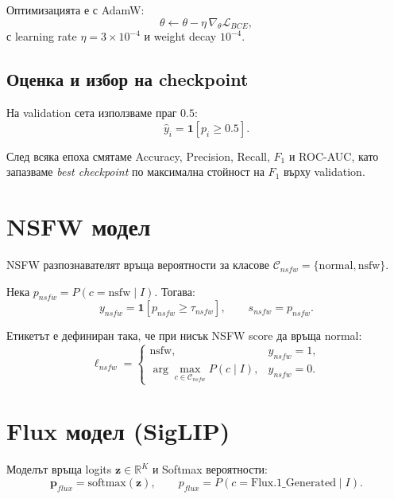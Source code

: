 \documentclass[12pt,a4paper]{article}
\begin{document}
Оптимизацията е с AdamW:
\begin{equation}
\theta \leftarrow \theta - \eta\,\nabla_{\theta}\mathcal{L}_{BCE},
\end{equation}
с learning rate $\eta=3\times10^{-4}$ и weight decay $10^{-4}$.

\subsection{Оценка и избор на checkpoint}

На validation сета използваме праг $0.5$:
\begin{equation}
\hat{y}_i = \mathbf{1}[p_i \ge 0.5].
\end{equation}

След всяка епоха смятаме Accuracy, Precision, Recall, $F_1$ и ROC-AUC,
като запазваме \textit{best checkpoint} по максимална стойност на
$F_1$ върху validation.

\section{NSFW модел}

NSFW разпознавателят връща вероятности за класове
$\mathcal{C}_{nsfw}=\{\text{normal},\text{nsfw}\}$.

Нека $p_{nsfw}=P(c=\text{nsfw}\mid I)$. Тогава:
\begin{equation}
y_{nsfw}=\mathbf{1}[p_{nsfw}\ge\tau_{nsfw}], \qquad s_{nsfw}=p_{nsfw}.
\end{equation}

Етикетът е дефиниран така, че при нисък NSFW score да връща normal:
\begin{equation}
\ell_{nsfw}=
\begin{cases}
\text{nsfw}, & y_{nsfw}=1,\\
\arg\max\limits_{c\in\mathcal{C}_{nsfw}} P(c\mid I), & y_{nsfw}=0.
\end{cases}
\end{equation}

\section{Flux модел (SigLIP)}

Моделът връща logits $\mathbf{z}\in\mathbb{R}^{K}$ и Softmax вероятности:
\begin{equation}
\mathbf{p}_{flux} = \text{softmax}(\mathbf{z}),
\qquad
p_{flux} = P(c=\text{Flux.1\_Generated}\mid I).
\end{equation}
\end{document}
